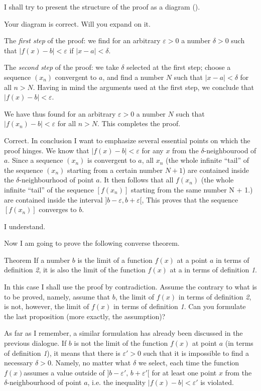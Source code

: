 {\rdr I shall try to present the structure of the proof as a diagram ().

\athr Your diagram is correct. Will you expand on it. 

\rdr The \emph{first step} of the proof: we find for an arbitrary $\varepsilon
> 0$ a number $\delta > 0$ such that $| f(x)- b | < \varepsilon$ if $|x - a| < \delta$. 

The \emph{second step} of the proof: we take $\delta$ selected at the
first step; choose a sequence $(x_{n})$ convergent to $a$, and find a number $N$ such that  $|x - a| < \delta$ for all $n > N$. Having in mind the arguments used at the first step, we conclude that $| f(x)- b | < \varepsilon$. 

We have thus found for an arbitrary $\varepsilon > 0$ a number $N$ such that  $| f(x_{n})- b | < \varepsilon$ for all $n > N$. This completes the proof.

\athr Correct. In conclusion I want to emphasize several essential points on which the proof hinges. We know that $| f(x)- b | < \varepsilon$ for any $x$ from the $\delta$-neighbourood of $a$. Since a sequence $(x_{n})$ is convergent to $a$, all $x_{n}$ (the whole infinite ``tail'' of the sequence $(x_{n})$ starting from a certain number $N +1$) are contained inside the $\delta$-neighbourhood of point $a$. It then follows that all $f (x_{n} )$ (the whole infinite	``tail'' of the sequence $[f (x_{n} )]$ starting from the same number N + 1.) are contained inside the interval $] b - \varepsilon, b + \varepsilon[$, This proves that the sequence $[f (x_{n})]$ converges to $b$.

\rdr I understand.

\athr Now I am going to prove the following converse theorem.
\begin{mytheo}{Theorem}
If a number $b$ is the limit of a function $f (x)$ at a point $a$ in terms of definition \emph{2}, it is also the limit of the function $f (x)$ at a in terms of definition \emph{1}.
\end{mytheo}
In this case I shall use the proof by contradiction. Assume the contrary to what is to be proved, namely, assume that $b$, the limit of $f (x)$ in terms of definition \emph{2}, is not, however, the limit of $f (x)$ in terms of definition \emph{1}. Can you formulate the last proposition (more exactly, the assumption)?

\rdr As far as I remember, a similar formulation has already been discussed in the previous dialogue. If $b$ is not the limit of the function $f (x)$ at point $a$ (in terms of definition \emph{1}), it means that there is $\varepsilon' > 0$ such that it is impossible to find a necessary $\delta> 0$. Namely, no matter what $\delta$ we select, each time the function $f (x) $assumes a value outside of $]b - \varepsilon', \, b + \varepsilon'[$ for at least one point $x$ from the $\delta$-neighbourhood of point $a$, i.e. the inequality $| f(x)- b | < \varepsilon'$ is violated.

}
